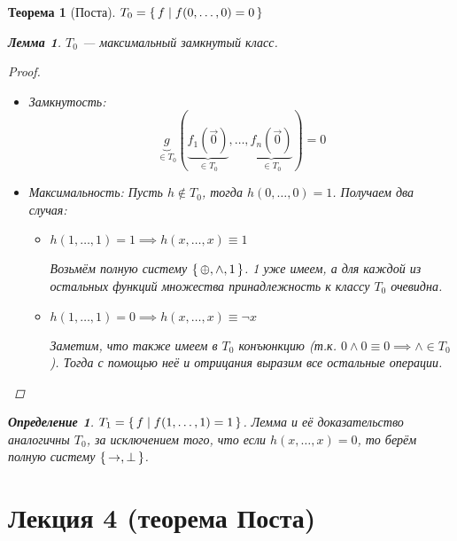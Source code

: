 \documentclass[12pt]{article}
\let\im\rightarrow
\let\eq\equiv
\let\la\land
\let\n\neg
\let\nin\notin
\theoremstyle{definition}
\newtheorem{definition}{Определение}[section]
\theoremstyle{plain}
\newtheorem{theorem}{Теорема}[section]
\newtheorem{lemma}{Лемма}[section]
\theoremstyle{remark}
\begin{document}
\begin{theorem}[Поста]
  $T_0 = \set{f \mid f(0, \ldots, 0) = 0}$
  \begin{lemma}
    $T_0$ --- максимальный замкнутый класс.
    \begin{proof}
      \begin{itemize}
        \item Замкнутость:
          \begin{displaymath}
            \underbrace{g}_{\in T_0}(\underbrace{f_1(\vec{0})}_{\in
              T_0}, \ldots,
            \underbrace{f_n(\vec{0})}_{\in T_0}) = 0
          \end{displaymath}

        \item Максимальность:
          Пусть $h \nin T_0$, тогда $h(0, \ldots, 0) = 1$. Получаем два случая:
          \begin{itemize}
            \item $h(1, \ldots, 1) = 1 \implies h(x, \ldots, x) \eq 1$

              Возьмём полную систему $\set{\oplus, \la, 1}$. 1 уже имеем, а для
              каждой из остальных функций множества принадлежность к
              классу $T_0$ очевидна.

            \item $h(1, \ldots, 1) = 0 \implies h(x, \ldots, x) \eq \n x$

              Заметим, что также имеем в $T_0$ конъюнкцию (т.к. $0
              \land 0 \eq 0 \implies \land \in T_0$). Тогда с помощью
              неё и отрицания выразим все остальные операции.
          \end{itemize}

      \end{itemize}
    \end{proof}
  \end{lemma}

  \begin{definition}
    $T_1 = \set{f \mid f(1, \ldots, 1) = 1}$. Лемма и её
    доказательство аналогичны $T_0$, за исключением того, что если
    $h(x, \dots, x) = 0$, то берём полную систему $\set{\im, \perp}$.
  \end{definition}
\end{theorem}

\pagebreak

\section{Лекция 4 (теорема Поста)}
\end{document}

